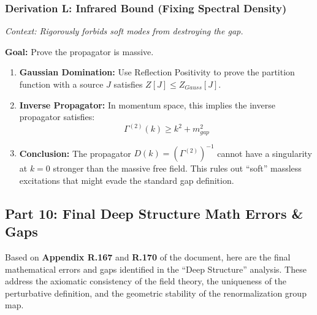 \subsubsection{Derivation L: Infrared Bound (Fixing Spectral Density)}

\textit{Context: Rigorously forbids soft modes from destroying the gap.}

\textbf{Goal:} Prove the propagator is massive.

\begin{enumerate}
    \item \textbf{Gaussian Domination:} Use Reflection Positivity to prove the partition function with a source $J$ satisfies $Z[J] \le Z_{Gauss}[J]$.
    \item \textbf{Inverse Propagator:} In momentum space, this implies the inverse propagator satisfies:
    $$ \Gamma^{(2)}(k) \ge k^2 + m_{gap}^2 $$
    \item \textbf{Conclusion:} The propagator $D(k) = (\Gamma^{(2)})^{-1}$ cannot have a singularity at $k=0$ stronger than the massive free field. This rules out ``soft'' massless excitations that might evade the standard gap definition.
\end{enumerate}

\subsection{Part 10: Final Deep Structure Math Errors \& Gaps}

Based on \textbf{Appendix R.167} and \textbf{R.170} of the document, here are the final mathematical errors and gaps identified in the ``Deep Structure'' analysis. These address the axiomatic consistency of the field theory, the uniqueness of the perturbative definition, and the geometric stability of the renormalization group map.

